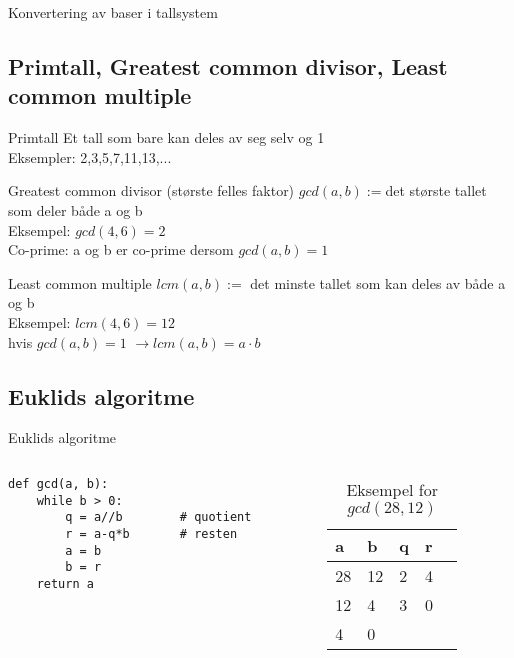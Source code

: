\begin{frame}
Konvertering av baser i tallsystem
\end{frame}

\subsection*{Primtall, Greatest common divisor, Least common multiple}
\begin{frame}
\begin{block}{Primtall}
Et tall som bare kan deles av seg selv og 1\\
Eksempler: 2,3,5,7,11,13,...
\end{block}

\begin{block}{Greatest common divisor (største felles faktor)}
$gcd(a,b) := $det største tallet som deler både a og b\\
Eksempel: $gcd(4,6)=2$\\
Co-prime: a og b er co-prime dersom $gcd(a,b)=1$
\end{block}

\begin{block}{Least common multiple}
$lcm(a,b) := $ det minste tallet som kan deles av både a og b\\
Eksempel: $lcm(4,6)=12$\\
hvis $gcd(a,b) = 1$ $\rightarrow lcm(a,b) = a\cdot b$
\end{block}
\end{frame}

\subsection*{Euklids algoritme}
\begin{frame}[fragile]{Euklids algoritme}
\begin{columns}
    \begin{column}{0.58\textwidth}
\begin{verbatim}
def gcd(a, b):
    while b > 0:
        q = a//b        # quotient
        r = a-q*b       # resten
        a = b
        b = r
    return a
\end{verbatim}
 	\end{column}
    \begin{column}{0.38\textwidth}
\begin{table}
\begin{tabular}{l|l|l|l|l}
a & b & q & r \\ \hline
28 & 12 & 2 & 4\\
12 & 4 & 3 & 0\\
4 & 0 &  & 
\end{tabular}
\caption{Eksempel for $gcd(28,12)$}
\end{table}
 	\end{column}
\end{columns}


\end{frame}

